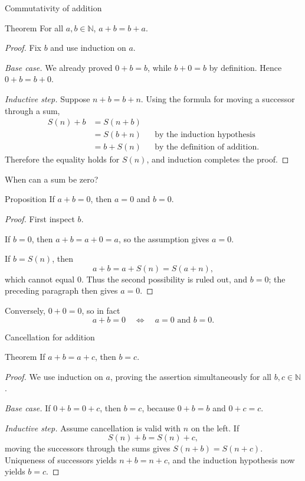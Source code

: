 \documentclass[aspectratio=169,11pt]{beamer}
\newcommand{\N}{\mathbb N}
\newcommand{\suc}[1]{S(#1)}
\begin{document}
\begin{frame}{Commutativity of addition}
  \begin{block}{Theorem}
    For all \(a,b\in\N\), \(a+b=b+a\).
  \end{block}

  \begin{proof}
    Fix \(b\) and use induction on \(a\).

    \emph{Base case.} We already proved \(0+b=b\), while \(b+0=b\) by
    definition.  Hence \(0+b=b+0\).

    \emph{Inductive step.} Suppose \(n+b=b+n\).  Using the formula for
    moving a successor through a sum,
    \begin{align*}
      \suc n+b
        &=\suc{n+b}\\
        &=\suc{b+n} &&\text{by the induction hypothesis}\\
        &=b+\suc n &&\text{by the definition of addition}.
    \end{align*}
    Therefore the equality holds for \(\suc n\), and induction completes the proof.
  \end{proof}
\end{frame}

\begin{frame}{When can a sum be zero?}
  \small
  \begin{block}{Proposition}
    If \(a+b=0\), then \(a=0\) and \(b=0\).
  \end{block}

  \begin{proof}
    First inspect \(b\).

    If \(b=0\), then \(a+b=a+0=a\), so the assumption gives \(a=0\).

    If \(b=\suc n\), then
    \[
      a+b=a+\suc n=\suc{a+n},
    \]
    which cannot equal \(0\).  Thus the second possibility is ruled out, and
    \(b=0\); the preceding paragraph then gives \(a=0\).
  \end{proof}

  Conversely, \(0+0=0\), so in fact
  \[
    a+b=0\quad\Longleftrightarrow\quad a=0\text{ and }b=0.
  \]
\end{frame}

\begin{frame}{Cancellation for addition}
  \begin{block}{Theorem}
    If \(a+b=a+c\), then \(b=c\).
  \end{block}

  \begin{proof}
    We use induction on \(a\), proving the assertion simultaneously for all
    \(b,c\in\N\).

    \emph{Base case.} If \(0+b=0+c\), then \(b=c\), because \(0+b=b\) and
    \(0+c=c\).

    \emph{Inductive step.} Assume cancellation is valid with \(n\) on the left.
    If
    \[
      \suc n+b=\suc n+c,
    \]
    moving the successors through the sums gives
    \(\suc{n+b}=\suc{n+c}\).  Uniqueness of successors yields \(n+b=n+c\),
    and the induction hypothesis now yields \(b=c\).
  \end{proof}
\end{frame}
\end{document}

